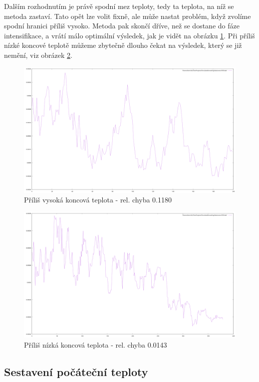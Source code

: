 \documentclass[12pt,a4paper]{article}
\begin{document}
Dalším rozhodnutím je právě spodní mez teploty, tedy ta teplota, na níž se metoda zastaví. Tato opět lze volit fixně, ale může nastat problém, když zvolíme spodní hranici příliš vysoko. Metoda pak skončí dříve, než se dostane do fáze intensifikace, a vrátí málo optimální výsledek, jak je vidět na obrázku \ref{tooHighEnd}. Při příliš nízké koncové teplotě můžeme zbytečně dlouho čekat na výsledek, který se již nemění, viz obrázek \ref{tooLowEnd}.

\begin{figure}[H]
\includegraphics[width=\textwidth]{tooHighEnd}
\caption{Příliš vysoká koncová teplota - rel. chyba 0.1180}
\label{tooHighEnd}
\end{figure}

\begin{figure}[H]
\includegraphics[width=\textwidth]{tooLowEnd}
\caption{Příliš nízká koncová teplota - rel. chyba 0.0143}
\label{tooLowEnd}
\end{figure}

\subsection{Sestavení počáteční teploty}
\label{startingTemp}
\end{document}
